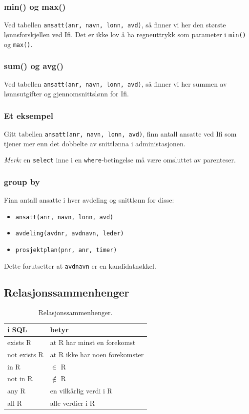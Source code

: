 \documentclass[11pt,a4paper]{article}
\begin{document}
\subsubsection{min() og max()}

Ved tabellen \texttt{ansatt(anr, navn, lonn, avd)}, så finner vi her den største lønnsforskjellen ved Ifi.
Det er ikke lov å ha regneuttrykk som parameter i \texttt{min()} og \texttt{max()}.

\subsubsection{sum() og avg()}

Ved tabellen \texttt{ansatt(anr, navn, lonn, avd)}, så finner vi her summen av lønnsutgifter og gjennomsnittslønn for Ifi.

\subsubsection{Et eksempel}
Gitt tabellen \texttt{ansatt(anr, navn, lonn, avd)}, finn antall ansatte ved Ifi som tjener mer enn det dobbelte av snittlønna i administasjonen.

\textit{Merk:} en \texttt{select} inne i en \texttt{where}-betingelse må være omsluttet av parenteser.

\subsubsection{group by}
Finn antall ansatte i hver avdeling og snittlønn for disse:
\begin{itemize}
\item{\texttt{ansatt(anr, navn, lonn, avd)}}
\item{\texttt{avdeling(avdnr, avdnavn, leder)}}
\item{\texttt{prosjektplan(pnr, anr, timer)}}
\end{itemize}



Dette forutsetter at \texttt{avdnavn} er en kandidatnøkkel.

\subsection{Relasjonssammenhenger}
\begin{table}[h!]
\begin{center}
\begin{tabular}{| l | l |}
\hline
\textbf{i SQL} & \textbf{betyr} \\
\hline
exists R & at R har minst en forekomst \\
\hline
not exists R & at R ikke har noen forekomster \\
\hline
in R & $\in$ R \\
\hline
not in R & $\notin$ R \\
\hline
any R & en vilkårlig verdi i R \\
\hline
all R & alle verdier i R \\
\hline
\end{tabular}
\end{center}
\caption{Relasjonssammenhenger.}
\end{table}
\end{document}

